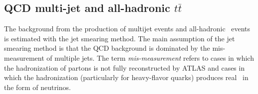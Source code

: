 

\subsection{QCD multi-jet and all-hadronic \boldmath$t\bar{t}$ }
\label{sec:QCDbkgd}
The background from the production of multijet events and all-hadronic
\ttbar\ events is estimated with the jet smearing method. The main assumption of the jet smearing method is that the QCD background is dominated by the mis-measurement of multiple jets. The term {\it mis-measurement} refers to cases in which the hadronization of partons is not fully reconstructed by ATLAS and cases in which the hadronization (particularly for heavy-flavor quarks) produces real \met\ in the form of neutrinos. \\

